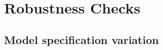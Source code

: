     \endgroup













\chapter{Robustness Checks}

\section{Model specification variation}
\label{modelspecificationvariation}


%
%
%
%
%


